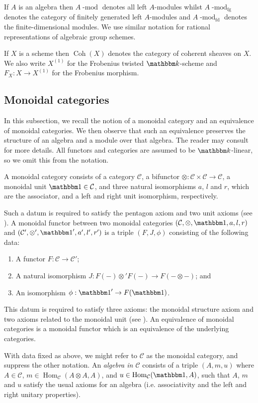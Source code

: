 \documentclass[twoside,12pt,reqno]{amsart}
\theoremstyle{remark}
\numberwithin{equation}{section}
\def\k{{\mathbbm k}}
\def\lmod{\!\operatorname{-mod}}
\def\Hom{\operatorname{Hom}}
\def\Coh{\operatorname{Coh}}
\def\one{{\mathbbm 1}}
\def\cC{\mathcal{C}}
\newcommand{\fg}{\operatorname{fg}}
\newcommand{\fd}{\operatorname{fd}}
\begin{document}
If $A$ is an algebra then $A\lmod$ denotes all left $A$-modules whilst $A\lmod_{\fg}$ denotes the category of finitely generated left $A$-modules and $A\lmod_{\fd}$ denotes the finite-dimensional modules. We use similar notation for rational representations of algebraic group schemes.

If $X$ is a scheme then $\Coh(X)$ denotes the category of coherent sheaves on $X$. We also write $X^{(1)}$ for the Frobenius twisted $\k$-scheme and $F_X : X \to X^{(1)}$ for the Frobenius morphism. 

 \subsection{Monoidal categories}

 In this subsection, we recall the notion of a monoidal category and an equivalence of monoidal categories. We then observe that such an equivalence preserves the structure of an algebra and a module over that algebra. The reader may consult \cite{EGNO} for more details. All functors and categories are assumed to be $\k$-linear, so we omit this from the notation.

 A monoidal category consists of a category $\cC$, a bifunctor $\otimes:\cC\times\cC\to \cC$, a monoidal unit $\one\in\cC$, and three natural isomorphisms $a$, $l$ and $r$, which are the associator, and a left and right unit isomorphism, respectively.
 
 Such a datum is required to satisfy the pentagon axiom and two unit axioms (see \cite[Definition 2.1.1]{EGNO}). A monoidal functor between two monoidal categories $(\cC,\otimes,\one,a,l,r)$ and $(\cC',\otimes',\one',a',l',r')$ is a triple $(F,J,\phi)$ consisting of the following data: 
\begin{enumerate}
    \item A functor $F:\cC\to\cC'$;
    \item A natural isomorphism $J:F(-)\otimes' F(-)\to F(-\otimes -)$; and 
    \item An isomorphism $\phi:\one'\to F(\one)$.
\end{enumerate}
This datum is required to satisfy three axioms: the monoidal structure axiom and two axioms related to the monoidal unit (see \cite[Definition 2.4.5]{EGNO}). An equivalence of monoidal categories is a monoidal functor which is an equivalence of the underlying categories.

With data fixed as above, we might refer to $\cC$ as the monoidal category, and suppress the other notation. An {\it algebra in $\cC$} consists of a triple $(A,m,u)$ where $A\in\cC$, $m\in\Hom_\cC(A\otimes A,A)$, and $u\in\Hom_\cC(\one,A)$, such that $A$, $m$ and $u$ satisfy the usual axioms for an algebra (i.e. associativity and the left and right unitary properties).
\end{document}
